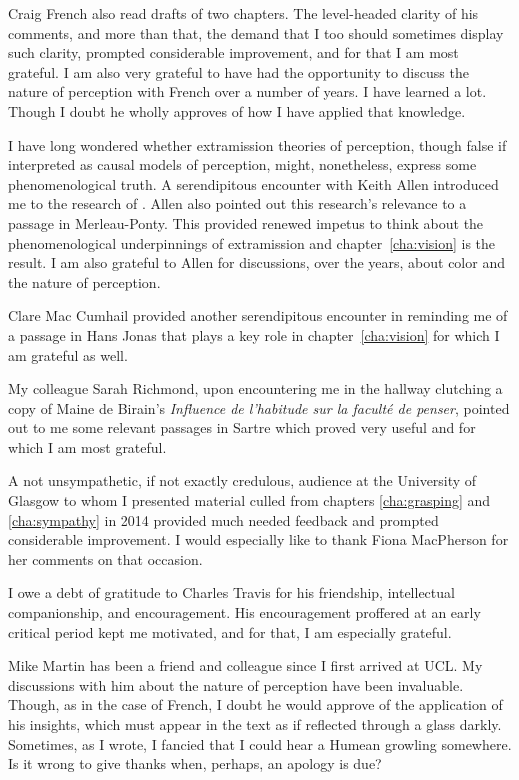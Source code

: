 Craig French also read drafts of two chapters. The level-headed clarity of his comments, and more than that, the demand that I too should sometimes display such clarity, prompted considerable improvement, and for that I am most grateful. I am also very grateful to have had the opportunity to discuss the nature of perception with French over a number of years. I have learned a lot. Though I doubt he wholly approves of how I have applied that knowledge.

I have long wondered whether extramission theories of perception, though false if interpreted as causal models of perception, might, nonetheless, express some phenomenological truth. A serendipitous encounter with Keith Allen introduced me to the research of \citet{Winer:1996as}. Allen also pointed out this research's relevance to a passage in Merleau-Ponty. This provided renewed impetus to think about the phenomenological underpinnings of extramission and chapter~\ref{cha:vision} is the result. I am also grateful to Allen for discussions, over the years, about color and the nature of perception.

Clare Mac Cumhail provided another serendipitous encounter in reminding me of a passage in Hans Jonas that plays a key role in chapter~\ref{cha:vision} for which I am grateful as well.

My colleague Sarah Richmond, upon encountering me in the hallway clutching a copy of Maine de Birain's \emph{Influence de l'habitude sur la facult\'{e} de penser}, pointed out to me some relevant passages in Sartre which proved very useful and for which I am most grateful.

A not unsympathetic, if not exactly credulous, audience at the University of Glasgow to whom I presented material culled from chapters \ref{cha:grasping} and \ref{cha:sympathy} in 2014 provided much needed feedback and prompted considerable improvement. I would especially like to thank Fiona MacPherson for her comments on that occasion.

I owe a debt of gratitude to Charles Travis for his friendship, intellectual companionship, and encouragement. His encouragement proffered at an early critical period kept me motivated, and for that, I am especially grateful.

Mike Martin has been a friend and colleague since I first arrived at UCL. My discussions with him about the nature of perception have been invaluable. Though, as in the case of French, I doubt he would approve of the application of his insights, which must appear in the text as if reflected through a glass darkly. Sometimes, as I wrote, I fancied that I could hear a Humean growling somewhere. Is it wrong to give thanks when, perhaps, an apology is due?

